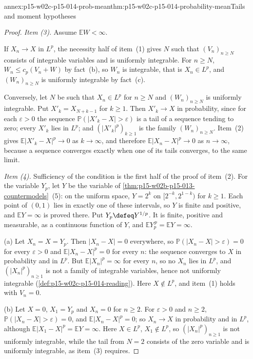 \begin{annexitem}{annex:p15-w02c-p15-014-prob-mean}{thm:p15-w02c-p15-014-probability-mean}{Tails and moment hypotheses}
\begin{proof}
\emph{Item (3).} Assume \(\mathbb EW<\infty\).

If \(X_n\to X\) in \(L^p\), the necessity half of item~(1) gives \(N\)
such that \((V_n)_{n\geq N}\) consists of integrable variables and is
uniformly integrable. For \(n\geq N\), \(W_n\leq c_p(V_n+W)\) by
fact~(b), so \(W_n\) is integrable, that is \(X_n\in L^p\), and
\((W_n)_{n\geq N}\) is uniformly integrable by fact~(c).

Conversely, let \(N\) be such that \(X_n\in L^p\) for \(n\geq N\) and
\((W_n)_{n\geq N}\) is uniformly integrable. Put
\(X'_k=X_{N+k-1}\) for \(k\geq1\). Then \(X'_k\to X\) in probability,
since for each \(\varepsilon>0\) the sequence
\(\mathbb P(|X'_k-X|>\varepsilon)\) is a tail of a sequence tending to
zero; every \(X'_k\) lies in \(L^p\); and \((|X'_k|^p)_{k\geq1}\) is
the family \((W_n)_{n\geq N}\). Item~(2) gives
\(\mathbb E|X'_k-X|^p\to0\) as \(k\to\infty\), and therefore
\(\mathbb E|X_n-X|^p\to0\) as \(n\to\infty\), because a sequence
converges exactly when one of its tails converges, to the same limit.

\emph{Item (4).} Sufficiency of the condition is the first half of the
proof of item~(2). For the variable \(Y_p\), let \(Y\) be the variable
of \cref{thm:p15-w02b-p15-013-countermodels}~(5): on the uniform space,
\(Y=2^k\) on \([2^{-k},2^{1-k})\) for \(k\geq1\). Each point of
\((0,1)\) lies in exactly one of these intervals, so \(Y\) is finite and
positive, and \(\mathbb EY=\infty\) is proved there. Put
\(Y_p\defeq Y^{1/p}\). It is finite, positive and measurable, as a
continuous function of \(Y\), and
\(\mathbb EY_p^{\,p}=\mathbb EY=\infty\).

(a) Let \(X_n=X=Y_p\). Then \(|X_n-X|=0\) everywhere, so
\(\mathbb P(|X_n-X|>\varepsilon)=0\) for every \(\varepsilon>0\) and
\(\mathbb E|X_n-X|^p=0\) for every \(n\): the sequence converges to
\(X\) in probability and in \(L^p\). But \(\mathbb E|X_n|^p=\infty\)
for every \(n\), so no \(X_n\) lies in \(L^p\), and
\((|X_n|^p)_{n\geq1}\) is not a family of integrable variables, hence
not uniformly integrable (\cref{def:p15-w02c-p15-014-reading}). Here
\(X\notin L^p\), and item~(1) holds with \(V_n=0\).

(b) Let \(X=0\), \(X_1=Y_p\) and \(X_n=0\) for \(n\geq2\). For
\(\varepsilon>0\) and \(n\geq2\), \(\mathbb P(|X_n-X|>\varepsilon)=0\),
and \(\mathbb E|X_n-X|^p=0\); so \(X_n\to X\) in probability and in
\(L^p\), although \(\mathbb E|X_1-X|^p=\mathbb EY=\infty\). Here
\(X\in L^p\), \(X_1\notin L^p\), so \((|X_n|^p)_{n\geq1}\) is not
uniformly integrable, while the tail from \(N=2\) consists of the zero
variable and is uniformly integrable, as item~(3) requires.
\end{proof}
\end{annexitem}


